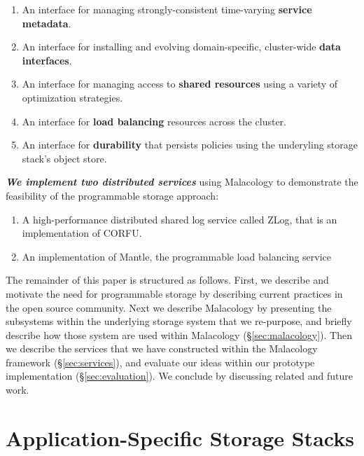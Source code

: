 \documentclass[preprint]{sigplanconf-eurosys}
\begin{document}
\begin{enumerate}

\item An interface for managing strongly-consistent time-varying \textbf{service
metadata}.

\item An interface for installing and evolving domain-specific, cluster-wide
\textbf{data interfaces}.

\item An interface for managing access to \textbf{shared resources} using a
variety of optimization strategies.

\item An interface for \textbf{load balancing} resources across the cluster.

\item An interface for \textbf{durability} that persists policies using the
underyling storage stack's object store.

\end{enumerate}

{\it \textbf{We implement two distributed services}} using Malacology to
demonstrate the feasibility of the programmable storage approach:

\begin{enumerate}

\item A high-performance distributed shared log service called ZLog, that is an
implementation of CORFU.~\cite{balakrishnan_corfu_2012}

\item An implementation of Mantle, the programmable load balancing
service~\cite{sevilla:sc15-mantle}

\end{enumerate}

The remainder of this paper is structured as follows. First, we describe and
motivate the need for programmable storage by describing current practices in
the open source community. Next we describe Malacology by presenting the
subsystems within the underlying storage system that we re-purpose, and briefly
describe how those system are used within Malacology (\S\ref{sec:malacology}).
Then we describe the services that we have constructed within the Malacology
framework (\S\ref{sec:services}), and evaluate our ideas within our prototype
implementation (\S\ref{sec:evaluation}).  We conclude by discussing related and future work.

\section{Application-Specific Storage Stacks}
\label{sec:application-specifc-storage-stacks}
\end{document}
